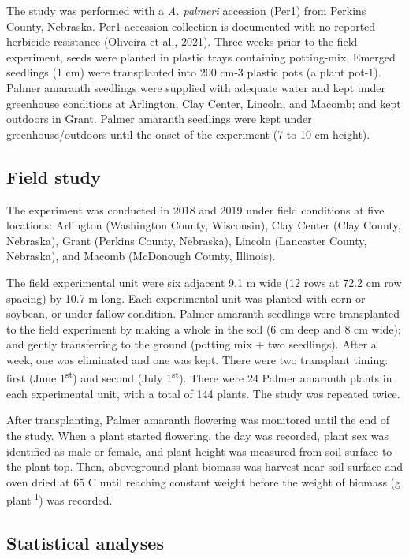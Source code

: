 \documentclass[utf8]{frontiersSCNS}
\begin{document}
The study was performed with a \emph{A. palmeri} accession (Per1) from
Perkins County, Nebraska. Per1 accession collection is documented with
no reported herbicide resistance (Oliveira et al., 2021). Three weeks
prior to the field experiment, seeds were planted in plastic trays
containing potting-mix. Emerged seedlings (1 cm) were transplanted into
200 cm-3 plastic pots (a plant pot-1). Palmer amaranth seedlings were
supplied with adequate water and kept under greenhouse conditions at
Arlington, Clay Center, Lincoln, and Macomb; and kept outdoors in Grant.
Palmer amaranth seedlings were kept under greenhouse/outdoors until the
onset of the experiment (7 to 10 cm height).

\hypertarget{field-study}{%
\subsection*{Field study}\label{field-study}}

The experiment was conducted in 2018 and 2019 under field conditions at
five locations: Arlington (Washington County, Wisconsin), Clay Center
(Clay County, Nebraska), Grant (Perkins County, Nebraska), Lincoln
(Lancaster County, Nebraska), and Macomb (McDonough County, Illinois).

The field experimental unit were six adjacent 9.1 m wide (12 rows at
72.2 cm row spacing) by 10.7 m long. Each experimental unit was planted
with corn or soybean, or under fallow condition. Palmer amaranth
seedlings were transplanted to the field experiment by making a whole in
the soil (6 cm deep and 8 cm wide); and gently transferring to the
ground (potting mix + two seedlings). After a week, one was eliminated
and one was kept. There were two transplant timing: first (June
1\textsuperscript{st}) and second (July 1\textsuperscript{st}). There
were 24 Palmer amaranth plants in each experimental unit, with a total
of 144 plants. The study was repeated twice.

After transplanting, Palmer amaranth flowering was monitored until the
end of the study. When a plant started flowering, the day was recorded,
plant sex was identified as male or female, and plant height was
measured from soil surface to the plant top. Then, aboveground plant
biomass was harvest near soil surface and oven dried at 65 C until
reaching constant weight before the weight of biomass (g
plant\textsuperscript{-1}) was recorded.

\hypertarget{statistical-analyses}{%
\subsection*{Statistical analyses}\label{statistical-analyses}}
\end{document}
